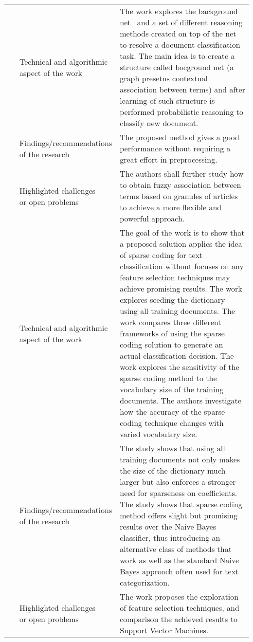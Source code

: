 \begin{landscape}
\begin{longtable}{lp{}p{}}
	\multirow{3}[0]{*}{~\citep{Lo2012}} & 
    \specialcell{Technical and algorithmic \\ aspect of the work} &
	The work explores the background net~\citep{Chen2011, Lo2011} and a set of different reasoning methods created on top of the net to resolve a document classification task. The main idea is to create a structure called bacground net (a graph presetns contextual association between terms) and after learning of such structure is performed probabilistic reasoning  to classify new document.    
    \\ & 
    \specialcell{Findings/recommendations \\ of the research} & 
	The proposed method gives a good performance without requiring a great effort in preprocessing. 
    \\ & 
    \specialcell{Highlighted challenges \\ or open problems} & 
    The authors shall further study how to obtain fuzzy association between terms based on granules of articles to achieve a more flexible and powerful approach.
	\\
	
	\multirow{3}[10]{*}{~\citep{Sainath2010}} & 
    \specialcell{Technical and algorithmic \\ aspect of the work} & 
    The goal of the work is to show that a proposed solution applies the idea of sparse coding for text classification without focuses on any feature selection techniques may achieve promising results. The work explores seeding the dictionary using all training documents. The work compares three different frameworks of using the sparse coding solution to generate an actual classification decision. The work explores the sensitivity of the sparse coding method to the vocabulary size of the training documents. The authors investigate how the accuracy of the sparse coding technique changes with varied vocabulary size.   
    \\ & 
    \specialcell{Findings/recommendations \\ of the research} & 
	The study shows that using all training documents not only makes the size of the dictionary much larger but also enforces a stronger need for sparseness on coefficients. The study shows that sparse coding method offers slight but promising results over the Naive Bayes classifier, thus introducing an alternative class of methods that work as well as the standard Naive Bayes approach often used for text categorization.  	
	\\ & 
	\specialcell{Highlighted challenges \\ or open problems} & 
	The work proposes the exploration of feature selection techniques, and comparison the achieved results to Support Vector Machines. 
	\\
	

\end{longtable}
\end{landscape}
